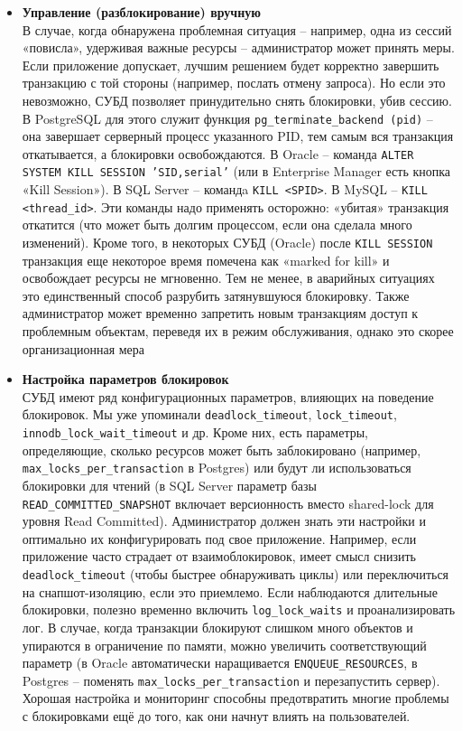 \begin{itemize}
    \item \textbf{Управление (разблокирование) вручную} ~\\
    В случае, когда обнаружена проблемная ситуация – например, одна из сессий «повисла», удерживая важные ресурсы – администратор может принять меры. Если приложение допускает, лучшим решением будет корректно завершить транзакцию с той стороны (например, послать отмену запроса). Но если это невозможно, СУБД позволяет принудительно снять блокировки, убив сессию. В PostgreSQL для этого служит функция \texttt{pg\_terminate\_backend (pid)} – она завершает серверный процесс указанного PID, тем самым вся транзакция откатывается, а блокировки освобождаются. В Oracle – команда \texttt{ALTER SYSTEM KILL SESSION 'SID,serial'} (или в Enterprise Manager есть кнопка «Kill Session»). В SQL Server – командa \texttt{KILL <SPID>}. В MySQL – \texttt{KILL <thread\_id>}. Эти команды надо применять осторожно: «убитая» транзакция откатится (что может быть долгим процессом, если она сделала много изменений). Кроме того, в некоторых СУБД (Oracle) после \texttt{KILL SESSION} транзакция еще некоторое время помечена как «marked for kill» и освобождает ресурсы не мгновенно. Тем не менее, в аварийных ситуациях это единственный способ разрубить затянувшуюся блокировку. Также администратор может временно запретить новым транзакциям доступ к проблемным объектам, переведя их в режим обслуживания, однако это скорее организационная мера
    \item \textbf{Настройка параметров блокировок} ~\\
    СУБД имеют ряд конфигурационных параметров, влияющих на поведение блокировок. Мы уже упоминали \texttt{deadlock\_timeout}, \texttt{lock\_timeout}, \texttt{innodb\_lock\_wait\_timeout} и др. Кроме них, есть параметры, определяющие, сколько ресурсов может быть заблокировано (например, \texttt{max\_locks\_per\_transaction} в Postgres) или будут ли использоваться блокировки для чтений (в SQL Server параметр базы \texttt{READ\_COMMITTED\_SNAPSHOT} включает версионность вместо shared-lock для уровня Read Committed). Администратор должен знать эти настройки и оптимально их конфигурировать под свое приложение. Например, если приложение часто страдает от взаимоблокировок, имеет смысл снизить \texttt{deadlock\_timeout} (чтобы быстрее обнаруживать циклы) или переключиться на снапшот-изоляцию, если это приемлемо. Если наблюдаются длительные блокировки, полезно временно включить \texttt{log\_lock\_waits} и проанализировать лог. В случае, когда транзакции блокируют слишком много объектов и упираются в ограничение по памяти, можно увеличить соответствующий параметр (в Oracle автоматически наращивается \texttt{ENQUEUE\_RESOURCES}, в Postgres – поменять \texttt{max\_locks\_per\_transaction} и перезапустить сервер). Хорошая настройка и мониторинг способны предотвратить многие проблемы с блокировками ещё до того, как они начнут влиять на пользователей.
 \end{itemize} 

